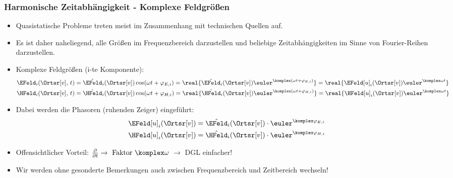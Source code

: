 \begin{frame} \frametitle{Harmonische Zeitabhängigkeit - Komplexe
Feldgrößen}
  \begin{itemize}[<+->]
  \item Quasistatische Probleme treten meist im Zusammenhang mit \alert{technischen Quellen} auf.
  \item Es ist daher naheliegend, alle Größen im \alert{Frequenzbereich} darzustellen und beliebige Zeitabhängigkeiten im Sinne von \alert{Fourier-Reihen} darzustellen.
    \item \alert{Komplexe Feldgrößen} (i-te Komponente):
\begin{align*}
		\EFeld_i(\Ortsr[v],\,t) &= \hat{\EFeld}_i(\Ortsr[v])  \cos(\omega  t + \varphi_{E,i}) = \real{\hat{\EFeld}_i(\Ortsr[v]) \euler^{\komplex  (\omega  t +  \varphi_{E,i})} } = \real{\EFeld[u]_i(\Ortsr[v]) \euler^{\komplex  \omega  t } }\\
		\HFeld_i(\Ortsr[v],\,t) &= \hat{\HFeld}_i(\Ortsr[v])  \cos(\omega  t + \varphi_{H,i}) = \real{\hat{\HFeld}_i(\Ortsr[v]) \euler^{\komplex  (\omega  t +  \varphi_{H,i})} } = \real{\HFeld[u]_i(\Ortsr[v]) \euler^{\komplex  \omega  t } }
\end{align*}
\item Dabei werden die \alert{Phasoren} (ruhenden Zeiger) eingeführt:
\begin{align*}
		\EFeld[u]_i(\Ortsr[v]) &= \hat{\EFeld}_i(\Ortsr[v]) \cdot \euler^{\komplex  \varphi_{E,i}} \\
		\HFeld[u]_i(\Ortsr[v]) &= \hat{\HFeld}_i(\Ortsr[v]) \cdot \euler^{\komplex  \varphi_{H,i}}
\end{align*}
\item Offensichtlicher Vorteil: $\frac{\partial}{\partial t} \to \text{ Faktor }\komplex\omega$ $\to$ DGL einfacher!
  \item Wir werden ohne gesonderte Bemerkungen auch zwischen Frequenzbereich und Zeitbereich wechseln!
  \end{itemize}
\end{frame}


